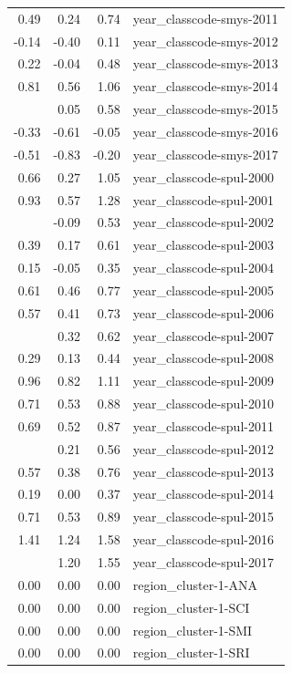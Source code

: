 \documentclass[]{article}
\begin{document}
\begin{longtable}[t]{rrrl}
0.49 & 0.24 & 0.74 & year\_classcode-smys-2011\\
-0.14 & -0.40 & 0.11 & year\_classcode-smys-2012\\
0.22 & -0.04 & 0.48 & year\_classcode-smys-2013\\
0.81 & 0.56 & 1.06 & year\_classcode-smys-2014\\
\addlinespace
0.32 & 0.05 & 0.58 & year\_classcode-smys-2015\\
-0.33 & -0.61 & -0.05 & year\_classcode-smys-2016\\
-0.51 & -0.83 & -0.20 & year\_classcode-smys-2017\\
0.66 & 0.27 & 1.05 & year\_classcode-spul-2000\\
0.93 & 0.57 & 1.28 & year\_classcode-spul-2001\\
\addlinespace
0.22 & -0.09 & 0.53 & year\_classcode-spul-2002\\
0.39 & 0.17 & 0.61 & year\_classcode-spul-2003\\
0.15 & -0.05 & 0.35 & year\_classcode-spul-2004\\
0.61 & 0.46 & 0.77 & year\_classcode-spul-2005\\
0.57 & 0.41 & 0.73 & year\_classcode-spul-2006\\
\addlinespace
0.47 & 0.32 & 0.62 & year\_classcode-spul-2007\\
0.29 & 0.13 & 0.44 & year\_classcode-spul-2008\\
0.96 & 0.82 & 1.11 & year\_classcode-spul-2009\\
0.71 & 0.53 & 0.88 & year\_classcode-spul-2010\\
0.69 & 0.52 & 0.87 & year\_classcode-spul-2011\\
\addlinespace
0.39 & 0.21 & 0.56 & year\_classcode-spul-2012\\
0.57 & 0.38 & 0.76 & year\_classcode-spul-2013\\
0.19 & 0.00 & 0.37 & year\_classcode-spul-2014\\
0.71 & 0.53 & 0.89 & year\_classcode-spul-2015\\
1.41 & 1.24 & 1.58 & year\_classcode-spul-2016\\
\addlinespace
1.37 & 1.20 & 1.55 & year\_classcode-spul-2017\\
0.00 & 0.00 & 0.00 & region\_cluster-1-ANA\\
0.00 & 0.00 & 0.00 & region\_cluster-1-SCI\\
0.00 & 0.00 & 0.00 & region\_cluster-1-SMI\\
0.00 & 0.00 & 0.00 & region\_cluster-1-SRI\\

\end{longtable}
\end{document}
